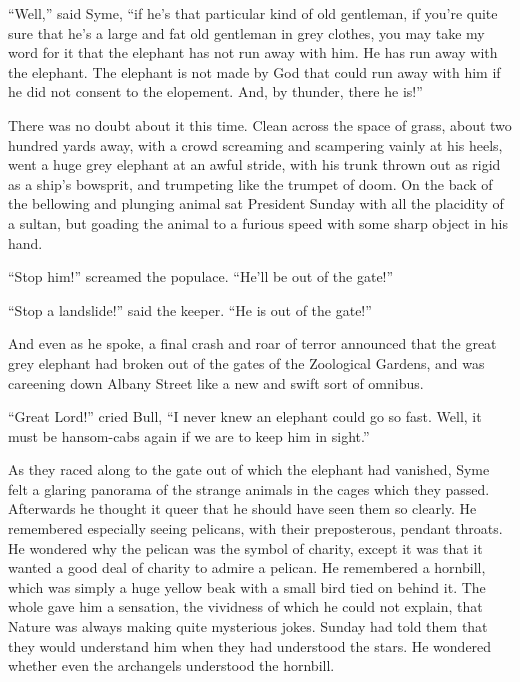 “Well,” said Syme, “if he’s that particular kind of old gentleman, if you’re quite sure that he’s a large and fat old gentleman in grey clothes, you may take my word for it that the elephant has not run away with him. He has run away with the elephant. The elephant is not made by God that could run away with him if he did not consent to the elopement. And, by thunder, there he is!”

There was no doubt about it this time. Clean across the space of grass, about two hundred yards away, with a crowd screaming and scampering vainly at his heels, went a huge grey elephant at an awful stride, with his trunk thrown out as rigid as a ship’s bowsprit, and trumpeting like the trumpet of doom. On the back of the bellowing and plunging animal sat President Sunday with all the placidity of a sultan, but goading the animal to a furious speed with some sharp object in his hand.

“Stop him!” screamed the populace. “He’ll be out of the gate!”

“Stop a landslide!” said the keeper. “He is out of the gate!”

And even as he spoke, a final crash and roar of terror announced that the great grey elephant had broken out of the gates of the Zoological Gardens, and was careening down Albany Street like a new and swift sort of omnibus.

“Great Lord!” cried Bull, “I never knew an elephant could go so fast. Well, it must be hansom-cabs again if we are to keep him in sight.”

As they raced along to the gate out of which the elephant had vanished, Syme felt a glaring panorama of the strange animals in the cages which they passed. Afterwards he thought it queer that he should have seen them so clearly. He remembered especially seeing pelicans, with their preposterous, pendant throats. He wondered why the pelican was the symbol of charity, except it was that it wanted a good deal of charity to admire a pelican. He remembered a hornbill, which was simply a huge yellow beak with a small bird tied on behind it. The whole gave him a sensation, the vividness of which he could not explain, that Nature was always making quite mysterious jokes. Sunday had told them that they would understand him when they had understood the stars. He wondered whether even the archangels understood the hornbill.

